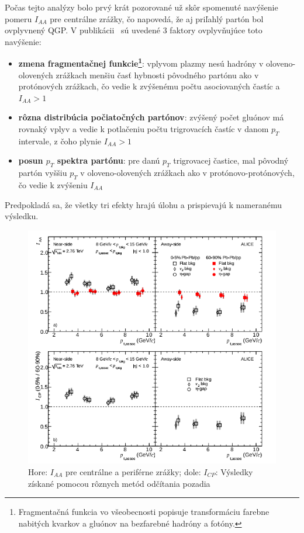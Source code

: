 \documentclass[thesismargins, thesislinespacing]{rnthesis}
\begin{document}
Počas tejto analýzy bolo prvý krát pozorované už skôr spomenuté navýšenie pomeru $I_{AA}$ pre centrálne zrážky, čo napovedá, že aj priľahlý partón bol ovplyvnený QGP. V publikácii~\cite{clanok} sú uvedené 3 faktory ovplyvňujúce toto navýšenie:
\begin{itemize}
	\item \textbf{zmena fragmentačnej funkcie\footnote{Fragmentačná funkcia vo všeobecnosti popisuje transformáciu farebne nabitých kvarkov a gluónov na bezfarebné hadróny a fotóny.}}: vplyvom plazmy nesú hadróny v oloveno-olovených zrážkach menšiu časť hybnosti pôvodného partónu ako v protónových zrážkach, čo vedie k zvýšenému počtu asociovaných častíc a $I_{AA}>1$
	\item \textbf{rôzna distribúcia počiatočných partónov}: zvýšený počet gluónov má rovnaký vplyv a vedie k potlačeniu počtu trigrovacích častíc v danom $p_T$ intervale, z čoho plynie $I_{AA}>1$
	\item \textbf{posun $p_T$ spektra partónu}: pre danú $p_T$ trigrovacej častice, mal pôvodný partón vyššiu $p_T$ v oloveno-olovených zrážkach ako v protónovo-protónových, čo vedie k zvýšeniu $I_{AA}$
\end{itemize}

Predpokladá sa, že všetky tri efekty hrajú úlohu a prispievajú k nameranému výsledku.

\begin{figure}[hbtp!]
	\centering
	\includegraphics[scale=0.8]{./Obrazky_praca/clanok2.png}
	\caption{ Hore: $I_{AA}$ pre centrálne a periférne zrážky; dole: $I_{CP}$: Výsledky získané pomocou rôznych metód odčítania pozadia~\cite{clanok}}
	\label{clanok2}
\end{figure}
\end{document}
